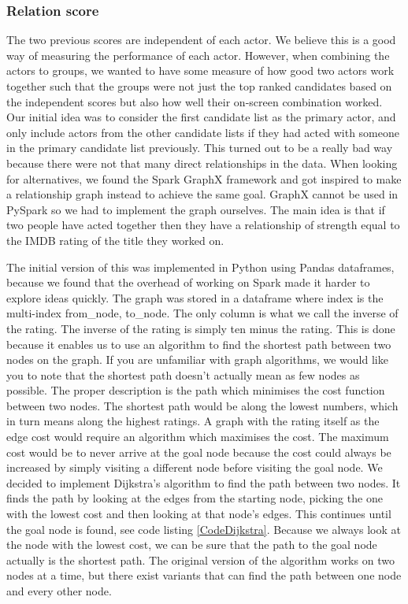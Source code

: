 \subsubsection{Relation score}

The two previous scores are independent of each actor. We believe this is a good way of measuring the performance of each actor. However, when combining the actors to groups, we wanted to have some measure of how good two actors work together such that the groups were not just the top ranked candidates based on the independent scores but also how well their on-screen combination worked. Our initial idea was to consider the first candidate list as the primary actor, and only include actors from the other candidate lists if they had acted with someone in the primary candidate list previously. This turned out to be a really bad way because there were not that many direct relationships in the data. When looking for alternatives, we found the Spark GraphX framework and got inspired to make a relationship graph instead to achieve the same goal. GraphX cannot be used in PySpark so we had to implement the graph ourselves. The main idea is that if two people have acted together then they have a relationship of strength equal to the IMDB rating of the title they worked on.

The initial version of this was implemented in Python using Pandas dataframes, because we found that the overhead of working on Spark made it harder to explore ideas quickly. The graph was stored in a dataframe where index is the multi-index from\_node, to\_node. The only column is what we call the inverse of the rating. The inverse of the rating is simply ten minus the rating. This is done because it enables us to use an algorithm to find the shortest path between two nodes on the graph. If you are unfamiliar with graph algorithms, we would like you to note that the shortest path doesn’t actually mean as few nodes as possible. The proper description is the path which minimises the cost function between two nodes. The shortest path would be along the lowest numbers, which in turn means along the highest ratings. A graph with the rating itself as the edge cost would require an algorithm which maximises the cost. The maximum cost would be to never arrive at the goal node because the cost could always be increased by simply visiting a different node before visiting the goal node. We decided to implement Dijkstra’s algorithm to find the path between two nodes. It finds the path by looking at the edges from the starting node, picking the one with the lowest cost and then looking at that node’s edges. This continues until the goal node is found, see code listing \ref{CodeDijkstra}. Because we always look at the node with the lowest cost, we can be sure that the path to the goal node actually is the shortest path. The original version of the algorithm works on two nodes at a time, but there exist variants that can find the path between one node and every other node.



